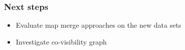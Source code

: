 \documentclass[xcolor={x11names}]{beamer}
\begin{document}
\begin{frame}
{\begin{figure}
  \end{figure}
  }
\end{frame}


\begin{frame}
\frametitle{Next steps}
\begin{itemize}
  \item Evaluate map merge approaches on the new data sets
  \item Investigate co-visibility graph
\end{itemize}
\end{frame}



\end{document}
